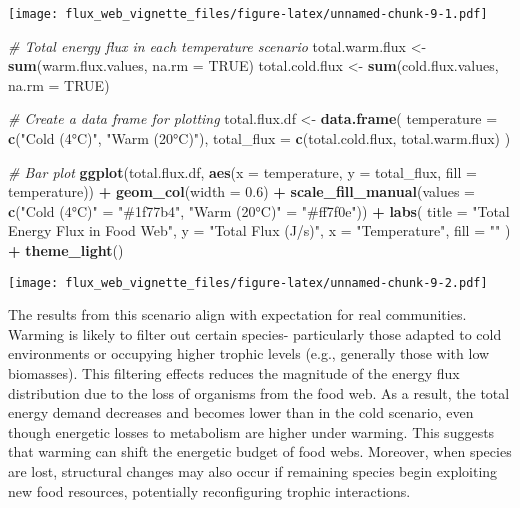 \documentclass[
]{article}
\newenvironment{Shaded}{\begin{snugshade}}{\end{snugshade}}
\newcommand{\AttributeTok}[1]{\textcolor[rgb]{0.13,0.29,0.53}{#1}}
\newcommand{\CommentTok}[1]{\textcolor[rgb]{0.56,0.35,0.01}{\textit{#1}}}
\newcommand{\ConstantTok}[1]{\textcolor[rgb]{0.56,0.35,0.01}{#1}}
\newcommand{\FloatTok}[1]{\textcolor[rgb]{0.00,0.00,0.81}{#1}}
\newcommand{\FunctionTok}[1]{\textcolor[rgb]{0.13,0.29,0.53}{\textbf{#1}}}
\newcommand{\NormalTok}[1]{#1}
\newcommand{\OtherTok}[1]{\textcolor[rgb]{0.56,0.35,0.01}{#1}}
\newcommand{\SpecialCharTok}[1]{\textcolor[rgb]{0.81,0.36,0.00}{\textbf{#1}}}
\newcommand{\StringTok}[1]{\textcolor[rgb]{0.31,0.60,0.02}{#1}}
\begin{document}
\texttt{[image: flux\_web\_vignette\_files/figure-latex/unnamed-chunk-9-1.pdf]}

\begin{Shaded}
\begin{Highlighting}[]
\CommentTok{\# Total energy flux in each temperature scenario}
\NormalTok{total.warm.flux }\OtherTok{\textless{}{-}} \FunctionTok{sum}\NormalTok{(warm.flux.values, }\AttributeTok{na.rm =} \ConstantTok{TRUE}\NormalTok{)}
\NormalTok{total.cold.flux }\OtherTok{\textless{}{-}} \FunctionTok{sum}\NormalTok{(cold.flux.values, }\AttributeTok{na.rm =} \ConstantTok{TRUE}\NormalTok{)}

\CommentTok{\# Create a data frame for plotting}
\NormalTok{total.flux.df }\OtherTok{\textless{}{-}} \FunctionTok{data.frame}\NormalTok{(}
  \AttributeTok{temperature =} \FunctionTok{c}\NormalTok{(}\StringTok{"Cold (4°C)"}\NormalTok{, }\StringTok{"Warm (20°C)"}\NormalTok{),}
  \AttributeTok{total\_flux =} \FunctionTok{c}\NormalTok{(total.cold.flux, total.warm.flux)}
\NormalTok{)}

\CommentTok{\# Bar plot}
\FunctionTok{ggplot}\NormalTok{(total.flux.df, }\FunctionTok{aes}\NormalTok{(}\AttributeTok{x =}\NormalTok{ temperature, }\AttributeTok{y =}\NormalTok{ total\_flux, }\AttributeTok{fill =}\NormalTok{ temperature)) }\SpecialCharTok{+}
  \FunctionTok{geom\_col}\NormalTok{(}\AttributeTok{width =} \FloatTok{0.6}\NormalTok{) }\SpecialCharTok{+}
  \FunctionTok{scale\_fill\_manual}\NormalTok{(}\AttributeTok{values =} \FunctionTok{c}\NormalTok{(}\StringTok{"Cold (4°C)"} \OtherTok{=} \StringTok{"\#1f77b4"}\NormalTok{, }\StringTok{"Warm (20°C)"} \OtherTok{=} \StringTok{"\#ff7f0e"}\NormalTok{)) }\SpecialCharTok{+}
  \FunctionTok{labs}\NormalTok{(}
    \AttributeTok{title =} \StringTok{"Total Energy Flux in Food Web"}\NormalTok{,}
    \AttributeTok{y =} \StringTok{"Total Flux (J/s)"}\NormalTok{,}
    \AttributeTok{x =} \StringTok{"Temperature"}\NormalTok{,}
    \AttributeTok{fill =} \StringTok{""}
\NormalTok{  ) }\SpecialCharTok{+}
  \FunctionTok{theme\_light}\NormalTok{()}
\end{Highlighting}
\end{Shaded}

\texttt{[image: flux\_web\_vignette\_files/figure-latex/unnamed-chunk-9-2.pdf]}

The results from this scenario align with expectation for real
communities. Warming is likely to filter out certain species-
particularly those adapted to cold environments or occupying higher
trophic levels (e.g., generally those with low biomasses). This
filtering effects reduces the magnitude of the energy flux distribution
due to the loss of organisms from the food web. As a result, the total
energy demand decreases and becomes lower than in the cold scenario,
even though energetic losses to metabolism are higher under warming.
This suggests that warming can shift the energetic budget of food webs.
Moreover, when species are lost, structural changes may also occur if
remaining species begin exploiting new food resources, potentially
reconfiguring trophic interactions.
\end{document}
